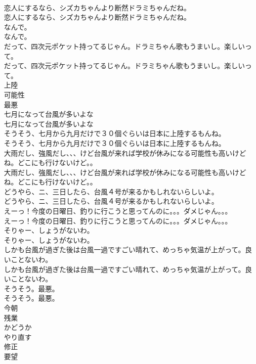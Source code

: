 \documentclass[8pt]{extreport}
\begin{document}
\begin{CJK}{UTF8}{min}
\\	恋人にするなら、シズカちゃんより断然ドラミちゃんだね。	
\\	恋人にするなら、シズカちゃんより断然ドラミちゃんだね。 
\\	なんで。	
\\	なんで。 
\\	だって、四次元ポケット持ってるじゃん。ドラミちゃん歌もうまいし。楽しいって。	
\\	だって、四次元ポケット持ってるじゃん。ドラミちゃん歌もうまいし。楽しいって。 
\\	上陸
\\	可能性
\\	最悪
\\	七月になって台風が多いよな	
\\	七月になって台風が多いよな 
\\	そうそう、七月から九月だけで３０個ぐらいは日本に上陸するもんね。	
\\	そうそう、七月から九月だけで３０個ぐらいは日本に上陸するもんね。 
\\	大雨だし、強風だし、、、けど台風が来れば学校が休みになる可能性も高いけどね。どこにも行けないけど。。	
\\	大雨だし、強風だし、、、けど台風が来れば学校が休みになる可能性も高いけどね。どこにも行けないけど。。 
\\	どうやら、ニ、三日したら、台風４号が来るかもしれないらしいよ。	
\\	どうやら、ニ、三日したら、台風４号が来るかもしれないらしいよ。 
\\	えーっ！今度の日曜日、釣りに行こうと思ってんのに。。。ダメじゃん。。。	
\\	えーっ！今度の日曜日、釣りに行こうと思ってんのに。。。ダメじゃん。。。 
\\	そりゃー、しょうがないわ。	
\\	そりゃー、しょうがないわ。 
\\	しかも台風が過ぎた後は台風一過ですごい晴れて、めっちゃ気温が上がって。良いことないわ。	
\\	しかも台風が過ぎた後は台風一過ですごい晴れて、めっちゃ気温が上がって。良いことないわ。 
\\	そうそう。最悪。	
\\	そうそう。最悪。 
\\	今朝
\\	残業
\\	かどうか
\\	やり直す
\\	修正
\\	要望

\end{CJK}
\end{document}
